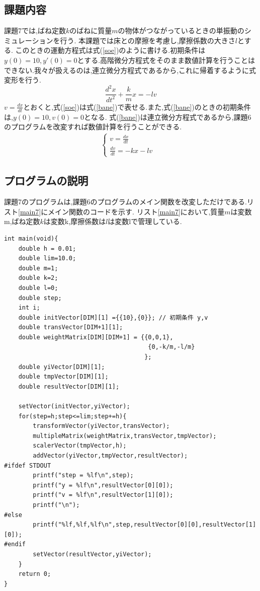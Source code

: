 \documentclass[a4j]{jarticle}
\begin{document}
      \subsection{課題内容}
      課題7では,ばね定数$k$のばねに質量$m$の物体がつながっているときの単振動のシミュレーションを行う.
      本課題では床との摩擦を考慮し,摩擦係数の大きさ$l$とする.
      このときの運動方程式は式(\ref{soe})のように書ける.初期条件は$y(0)=10,y'(0)=0$とする.高階微分方程式をそのまま数値計算を行うことは
      できない.我々が扱えるのは,連立微分方程式であるから,これに帰着するように式変形を行う.
      \begin{equation}
        \frac{d^2x}{dt^2}+\frac{k}{m}x=-lv
        \label{soe}
      \end{equation}
      $v=\frac{dx}{dt}$とおくと,式(\ref{soe})は式(\ref{bane})で表せる.また,式(\ref{bane})のときの初期条件は,$y(0)=10,v(0)=0$となる.
      式(\ref{bane})は連立微分方程式であるから,課題6のプログラムを改変すれば数値計算を行うことができる.
      \begin{eqnarray}
        \begin{cases}
          v = \frac{dx}{dt} & \\
          \frac{dv}{dt} = -kx-lv &
        \end{cases}
        \label{bane}
      \end{eqnarray}


      \subsection{プログラムの説明}
      課題7のプログラムは,課題6のプログラムのメイン関数を改変しただけである.リスト\ref{main7}にメイン関数のコードを示す.
      リスト\ref{main7}において,質量$m$は変数m,ばね定数$k$は変数k,摩擦係数は$l$は変数lで管理している.
      \begin{lstlisting}[basicstyle=\ttfamily\footnotesize, frame=single,label=main7,caption=メイン関数のコード]
int main(void){
    double h = 0.01;
    double lim=10.0;
    double m=1;
    double k=2;
    double l=0;
    double step;
    int i;
    double initVector[DIM][1] ={{10},{0}}; // 初期条件 y,v 
    double transVector[DIM+1][1];
    double weightMatrix[DIM][DIM+1] = {{0,0,1},
                                        {0,-k/m,-l/m}
                                       };
    double yiVector[DIM][1];
    double tmpVector[DIM][1];
    double resultVector[DIM][1];

    setVector(initVector,yiVector);
    for(step=h;step<=lim;step+=h){
        transformVector(yiVector,transVector);
        multipleMatrix(weightMatrix,transVector,tmpVector);
        scalerVector(tmpVector,h);
        addVector(yiVector,tmpVector,resultVector);
#ifdef STDOUT
        printf("step = %lf\n",step);
        printf("y = %lf\n",resultVector[0][0]);
        printf("v = %lf\n",resultVector[1][0]);
        printf("\n");
#else
        printf("%lf,%lf,%lf\n",step,resultVector[0][0],resultVector[1][0]);
#endif
        setVector(resultVector,yiVector);
    }
    return 0;
}
            \end{lstlisting}     
\end{document}
